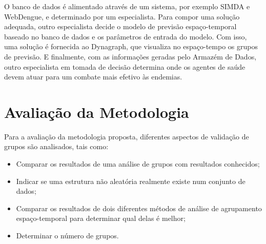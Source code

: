 O banco de dados é alimentado através de um sistema, por exemplo SIMDA e WebDengue, e determinado por um especialista. Para compor uma solução adequada, outro especialista decide o modelo de previsão espaço-temporal baseado no banco de dados e os parâmetros de entrada do modelo. Com isso, uma solução é fornecida ao Dynagraph, que visualiza no espaço-tempo os grupos de previsão. E finalmente, com as informações geradas pelo Armazém de Dados, outro especialista em tomada de decisão determina onde os agentes de saúde devem atuar para um combate mais efetivo às endemias.

\begin{figure}[!ht]
	\centering	
\end{figure}
\FloatBarrier

\section{Avaliação da Metodologia}

Para a avaliação da metodologia proposta, diferentes aspectos de validação de grupos são analisados, tais como:
\begin{itemize}
    \item Comparar os resultados de uma análise de grupos com resultados conhecidos;
    \item Indicar se uma estrutura não aleatória realmente existe num conjunto de dados;
    \item Comparar os resultados de dois diferentes métodos de análise de agrupamento espaço-temporal para determinar qual delas é melhor;
    \item Determinar o número de grupos.
\end{itemize}

